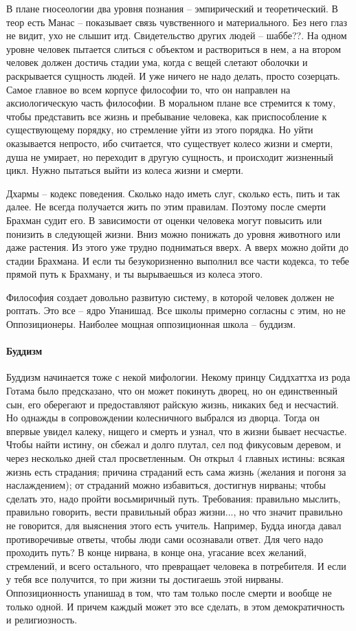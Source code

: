 \documentclass[a4paper, 12pt]{article}
\begin{document}
В плане гносеологии два уровня познания -- эмпирический и теоретический. В теор есть Манас -- показывает связь чувственного и материального. Без него глаз не видит, ухо не слышит итд. Свидетельство других людей -- шаббе??. На одном уровне человек пытается слиться с объектом и раствориться в нем, а на втором человек должен достичь стадии ума, когда с вещей слетают оболочки и раскрывается сущность людей. И уже ничего не надо делать, просто созерцать. Самое главное во всем корпусе философии то, что он направлен на аксиологическую часть философии. В моральном плане все стремится к тому, чтобы представить все жизнь и пребывание человека, как приспособление к существующему порядку, но стремление уйти из этого порядка. Но уйти оказывается непросто, ибо считается, что существует колесо жизни и смерти, душа не умирает, но переходит в другую сущность, и происходит жизненный цикл. Нужно пытаться выйти из колеса жизни и смерти. 

Дхармы -- кодекс поведения. Сколько надо иметь слуг, сколько есть, пить и так далее. Не всегда получается жить по этим правилам. Поэтому после смерти Брахман судит его. В зависимости от оценки человека могут повысить или понизить в следующей жизни. Вниз можно понижать до уровня животного или даже растения. Из этого уже трудно подниматься вверх. А вверх можно дойти до стадии Брахмана. И если ты безукоризненно выполнил все части кодекса, то тебе прямой путь к Брахману, и ты вырываешься из колеса этого. 

Философия создает довольно развитую систему, в которой человек должен не роптать. Это все -- ядро Упанишад. Все школы примерно согласны с этим, но не Оппозиционеры. Наиболее мощная оппозиционная школа -- буддизм. 

\paragraph{Буддизм}
Буддизм начинается тоже с некой мифологии. Некому принцу Сиддхаттха из рода Готама было предсказано, что он может покинуть дворец, но он единственный сын, его оберегают и предоставляют райскую жизнь, никаких бед и несчастий. Но однажды в сопровождении колесничного выбрался из дворца. Тогда он впервые увидел калеку, нищего и смерть и узнал, что в жизни бывает несчастье. Чтобы найти истину, он сбежал и долго плутал, сел под фикусовым деревом, и через несколько дней стал просветленным. Он открыл 4 главных истины: всякая жизнь есть страдания; причина страданий есть сама жизнь (желания и погоня за наслаждением); от страданий можно избавиться, достигнув нирваны; чтобы сделать это, надо пройти восьмиричный путь. Требования: правильно мыслить, правильно говорить, вести правильный образ жизни..., но что значит правильно не говорится, для выяснения этого есть учитель. Например, Будда иногда давал противоречивые ответы, чтобы люди сами осознавали ответ. Для чего надо проходить путь? В конце нирвана, в конце она, угасание всех желаний, стремлений, и всего остального, что превращает человека в потребителя. И если у тебя все получится, то при жизни ты достигаешь этой нирваны. Оппозиционность упанишад в том, что там только после смерти и вообще не только одной. И причем каждый может это все сделать, в этом демократичность и религиозность. 
\end{document}

